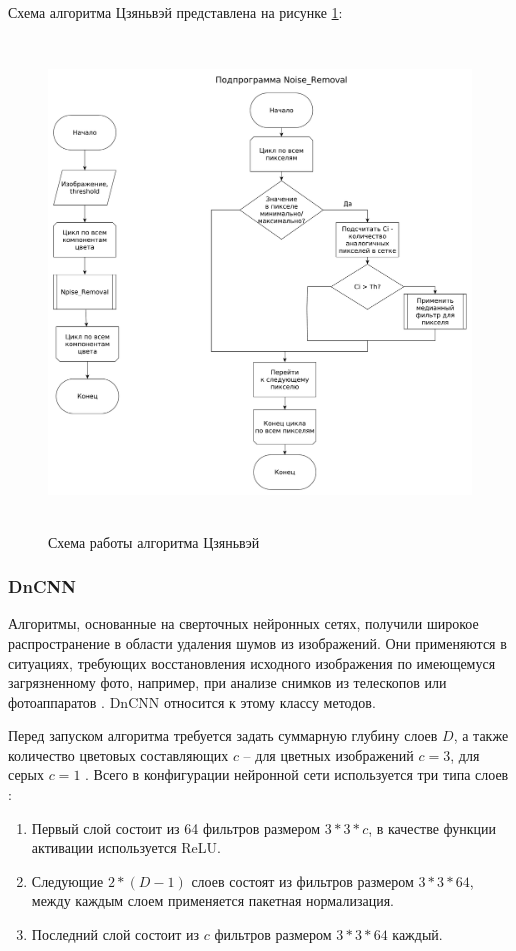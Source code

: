 Схема алгоритма Цзяньвэй представлена на рисунке \ref{fig::china}:
\FloatBarrier
\begin{figure}[h]	
	\begin{center}
		\includegraphics[height=13cm]{inc/pdf/china.pdf}
	\end{center}
	\captionsetup{justification=centering}
	\caption{Схема работы алгоритма Цзяньвэй}
	\label{fig::china}
\end{figure}
\FloatBarrier

\subsubsection{DnCNN}
Алгоритмы, основанные на сверточных нейронных сетях, получили широкое распространение в области удаления шумов из изображений.
Они применяются в ситуациях, требующих восстановления исходного изображения по имеющемуся загрязненному фото, например, при анализе снимков из телескопов или фотоаппаратов \cite{neural}. 
DnCNN относится к этому классу методов.

Перед запуском алгоритма требуется задать суммарную глубину слоев $D$, а также количество цветовых составляющих $c$ -- для цветных изображений $c=3$, для серых $c=1$ \cite{dcnn}. Всего в конфигурации нейронной сети используется три типа слоев \cite{dcnn2}:
\begin{enumerate}
	\item Первый слой состоит из 64 фильтров размером $3*3*c$, в качестве функции активации используется ReLU.
	\item Следующие $2*(D - 1)$ слоев состоят из фильтров размером $3*3*64$, между каждым слоем применяется пакетная нормализация.
	\item Последний слой состоит из $c$ фильтров размером $3*3*64$ каждый.
\end{enumerate}

